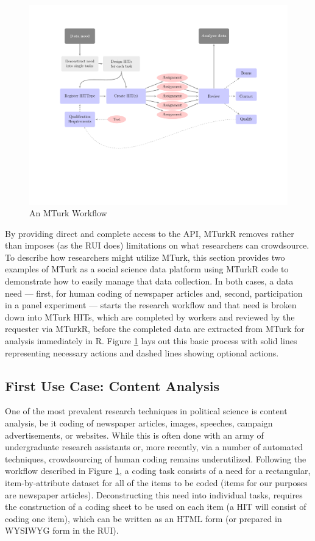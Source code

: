 \documentclass[11pt]{article}
\begin{document}
\begin{figure}
\begin{center}
\includegraphics[trim=1in 2.25in 1in 1in, clip=true, width=.7\textwidth]{MTurkR-workflow}
\end{center}
\caption{An MTurk Workflow}\label{fig:workflow}
\end{figure}

By providing direct and complete access to the API, MTurkR removes rather than imposes (as the RUI does) limitations on what researchers can crowdsource. To describe how researchers might utilize MTurk, this section provides two examples of MTurk as a social science data platform using MTurkR code to demonstrate how to easily manage that data collection. In both cases, a data need --- first, for human coding of newspaper articles and, second, participation in a panel experiment --- starts the research workflow and that need is broken down into MTurk HITs, which are completed by workers and reviewed by the requester via MTurkR, before the completed data are extracted from MTurk for analysis immediately in R. Figure \ref{fig:workflow} lays out this basic process with solid lines representing necessary actions and dashed lines showing optional actions.

\subsection{First Use Case: Content Analysis}

One of the most prevalent research techniques in political science is content analysis, be it coding of newspaper articles, images, speeches, campaign advertisements, or websites. While this is often done with an army of undergraduate research assistants or, more recently, via a number of automated techniques, crowdsourcing of human coding remains underutilized. Following the workflow described in Figure \ref{fig:workflow}, a coding task consists of a need for a rectangular, item-by-attribute dataset for all of the items to be coded (items for our purposes are newspaper articles). Deconstructing this need into individual tasks, requires the construction of a coding sheet to be used on each item (a HIT will consist of coding one item), which can be written as an HTML form (or prepared in WYSIWYG form in the RUI).
\end{document}
